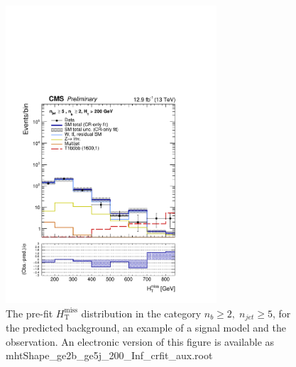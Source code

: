 \clearpage
\begin{figure}[tbhp]
    \caption{ 
    The pre-fit $H_{\mathrm{T}}^{\mathrm{miss}}$ distribution in the category $n_{b}\geq 2, \; n_{jet} \geq 5$, 
    for the predicted background, an example of a signal model and the observation.
    An electronic version of this figure is available as mhtShape\_ge2b\_ge5j\_200\_Inf\_crfit\_aux.root
    \label{fig:mhtShape_ge2b_ge5j_crfit} }
  \begin{center}
  \includegraphics[width=0.7\textwidth]{mhtShape_ge2b_ge5j_200_Inf_crfit_aux}
  \end{center}
\end{figure}


